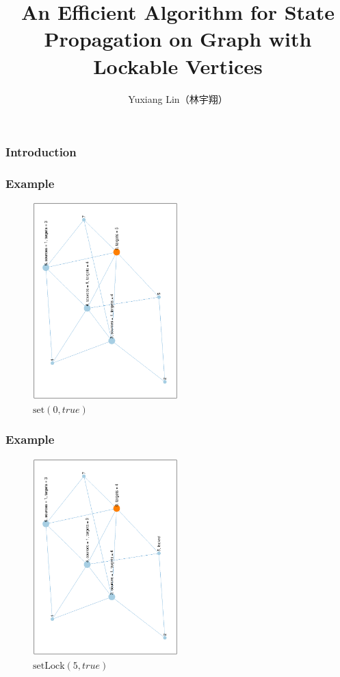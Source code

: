 \documentclass{beamer}
\begin{document}
\title{An Efficient Algorithm for State Propagation on Graph with Lockable Vertices}
\author{Yuxiang Lin（林宇翔）}
\date{}

\begin{frame}
	\titlepage
\end{frame}

\begin{frame}
	\frametitle{Introduction}
\end{frame}

\begin{frame}
	\frametitle{Example}
	\begin{figure}
		\centering
		\includegraphics[width=0.5\textwidth,angle=-90]{../paper/graph/example/0.eps}
		\caption{$ \mathrm{set}(0, \mathit{true}) $}
	\end{figure}
\end{frame}

\begin{frame}
	\frametitle{Example}
	\begin{figure}
		\centering
		\includegraphics[width=0.5\textwidth,angle=-90]{../paper/graph/example/1.eps}
		\caption{$ \mathrm{setLock}(5, \mathit{true}) $}
	\end{figure}
\end{frame}
\end{document}
